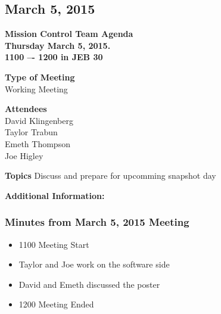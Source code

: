 \documentclass[pdftex,11pt]{article}
\begin{document}
\clearpage


\subsection{March 5, 2015}
{ \huge \bfseries Mission Control Team Agenda \\[0.4cm] }
{ \huge \bfseries Thursday March 5, 2015.\\1100 –-  1200  in JEB 30\\[0.4cm] }
\vspace*{2.5mm}

{ \large \bfseries \hspace*{2 mm} Type of Meeting\\}
\hspace*{12mm}  Working Meeting
\vspace*{1.5mm}

{ \large \bfseries \hspace*{2 mm} Attendees\\}
\hspace*{12mm} David Klingenberg\\
\hspace*{12mm} Taylor Trabun\\
\hspace*{12mm} Emeth Thompson\\
\hspace*{12mm} Joe Higley\\
\vspace*{1.5mm}

{ \large \bfseries \noindent Topics}
\hspace*{12mm} Discuss and prepare for upcomming snapshot day
\vspace*{2.5mm}

\vspace*{2.5mm}
{ \large \bfseries \noindent Additional Information:}

\subsubsection[short]{Minutes from March 5, 2015 Meeting}
\begin{itemize}
	\item 1100 \indent Meeting Start
	\item Taylor and Joe work on the software side
	\item David and Emeth discussed the poster
	\item 1200 \indent Meeting Ended
\end{itemize}	
\end{document}
